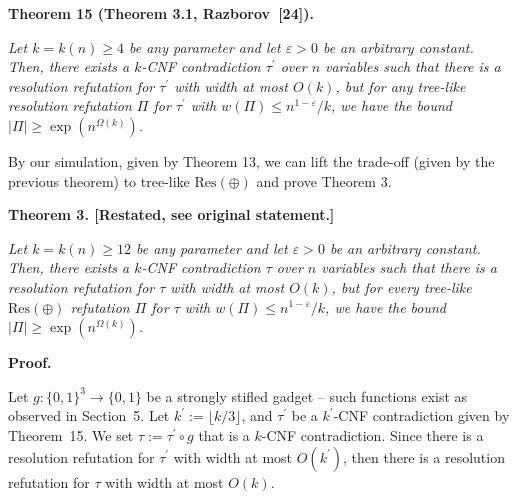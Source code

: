 \documentclass[10pt,a4paper]{article}
\begin{document}
\par\medskip\noindent\textbf{
\textbf{Theorem 15}\textbf{ }(Theorem 3.1, Razborov [24])\textbf{.}
}\par



\emph{Let $k=k(n)\geq 4$ be any parameter and let $\varepsilon>0$ be an arbitrary constant.
Then, there exists a $k$-CNF contradiction $\tau^{\prime}$ over $n$ variables such that there is a resolution refutation for $\tau^{\prime}$ with width at most $O(k)$, but for any tree-like resolution refutation $\Pi$ for $\tau^{\prime}$ with $w(\Pi)\leq n^{1-\varepsilon}/k$, we have the bound $|\Pi|\geq\exp(n^{\Omega(k)})$.}\par






By our simulation, given by Theorem 13, we can lift the trade-off (given by the previous theorem) to tree-like $\text{Res}(\oplus)$ and prove Theorem 3.\par






\par\medskip\noindent\textbf{
\textbf{Theorem 3}\textbf{.}
[Restated, see original statement.]}\par



\emph{Let $k=k(n)\geq 12$ be any parameter and let $\varepsilon>0$ be an arbitrary constant.
Then, there exists a $k$-CNF contradiction $\tau$ over $n$ variables such that there is a resolution refutation for $\tau$ with width at most $O(k)$, but for every tree-like $\text{Res}(\oplus)$ refutation $\Pi$ for $\tau$ with $w(\Pi)\leq n^{1-\varepsilon}/k$, we have the bound $|\Pi|\geq\exp(n^{\Omega(k)})$.}\par







\par\medskip\noindent\textbf{Proof.}\par




Let $g:\{0,1\}^{3}\to\{0,1\}$ be a strongly stifled gadget – such functions exist as observed in Section 5.
Let $k^{\prime}:=\lfloor k/3\rfloor$, and $\tau^{\prime}$ be a $k^{\prime}$-CNF contradiction given by Theorem 15.
We set $\tau:=\tau^{\prime}\circ g$ that is a $k$-CNF contradiction.
Since there is a resolution refutation for $\tau^{\prime}$ with width at most $O(k^{\prime})$, then there is a resolution refutation for $\tau$ with width at most $O(k)$.\par
\end{document}
